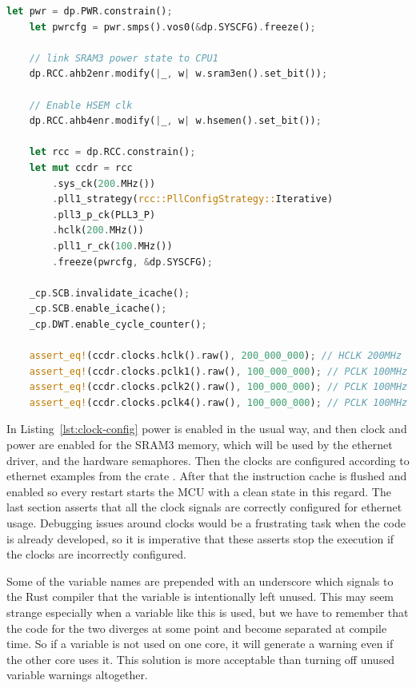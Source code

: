 \begin{lstlisting}[language=Rust,frame=single,float=!ht,style=customrust,label={lst:clock-config},caption={Initialization of Clocks, Resets, and Power Sources}]
    let pwr = dp.PWR.constrain();
    let pwrcfg = pwr.smps().vos0(&dp.SYSCFG).freeze();

    // link SRAM3 power state to CPU1
    dp.RCC.ahb2enr.modify(|_, w| w.sram3en().set_bit());

    // Enable HSEM clk
    dp.RCC.ahb4enr.modify(|_, w| w.hsemen().set_bit());

    let rcc = dp.RCC.constrain();
    let mut ccdr = rcc
        .sys_ck(200.MHz())
        .pll1_strategy(rcc::PllConfigStrategy::Iterative)
        .pll3_p_ck(PLL3_P)
        .hclk(200.MHz())
        .pll1_r_ck(100.MHz())
        .freeze(pwrcfg, &dp.SYSCFG);

    _cp.SCB.invalidate_icache();
    _cp.SCB.enable_icache();
    _cp.DWT.enable_cycle_counter();

    assert_eq!(ccdr.clocks.hclk().raw(), 200_000_000); // HCLK 200MHz
    assert_eq!(ccdr.clocks.pclk1().raw(), 100_000_000); // PCLK 100MHz
    assert_eq!(ccdr.clocks.pclk2().raw(), 100_000_000); // PCLK 100MHz
    assert_eq!(ccdr.clocks.pclk4().raw(), 100_000_000); // PCLK 100MHz
\end{lstlisting}

In Listing~\ref{lst:clock-config} power is enabled in the usual way, and then clock and power are enabled for the SRAM3 memory, which will be used by the ethernet driver, and the hardware semaphores. Then the clocks are configured according to ethernet examples from the  crate \cite{HalExamples}. After that the instruction cache is flushed and enabled so every restart starts the MCU with a clean state in this regard. The last section asserts that all the clock signals are correctly configured for ethernet usage. Debugging issues around clocks would be a frustrating task when the code is already developed, so it is imperative that these asserts stop the execution if the clocks are incorrectly configured.

Some of the variable names are prepended with an underscore which signals to the Rust compiler that the variable is intentionally left unused. This may seem strange especially when a variable like this is used, but we have to remember that the code for the two diverges at some point and become separated at compile time. So if a variable is not used on one core, it will generate a warning even if the other core uses it. This solution is more acceptable than turning off unused variable warnings altogether.

